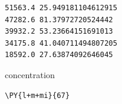     \begin{Verbatim}[commandchars=\\\{\}]
51563.4 25.949181104612915
47282.6 81.37972720524442
39932.2 53.23664151691013
34175.8 41.040711494807205
18592.0 27.63874092646045
    \end{Verbatim}

    concentration

    \begin{tcolorbox}[breakable, size=fbox, boxrule=1pt, pad at break*=1mm,colback=cellbackground, colframe=cellborder]
\begin{Verbatim}[commandchars=\\\{\}]
\PY{l+m+mi}{67}
\end{Verbatim}
\end{tcolorbox}



